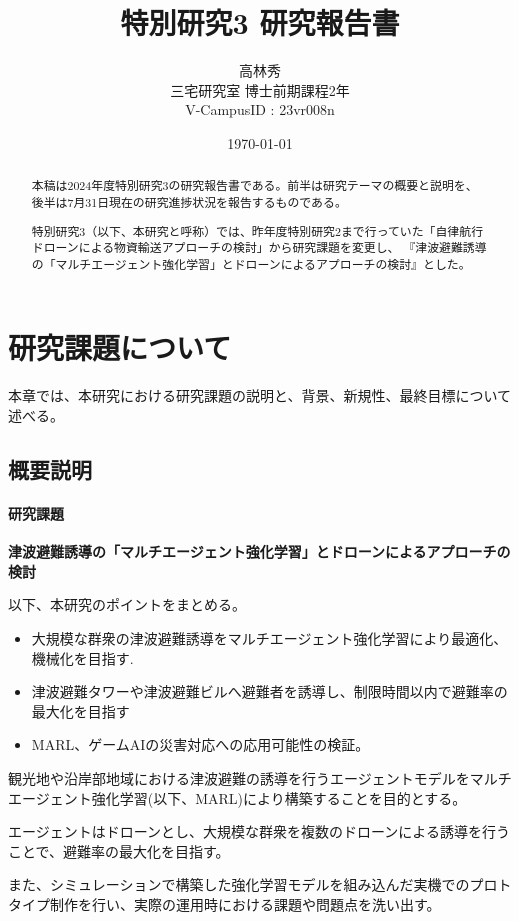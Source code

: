 \documentclass{article}[jsarticle]
\title{特別研究3 研究報告書}
\author{高林秀 \\ 三宅研究室 博士前期課程2年 \\ V-CampusID : 23vr008n}
\date{\today}
\begin{document}
\maketitle

\begin{abstract}
    \noindent
    本稿は2024年度特別研究3の研究報告書である。前半は研究テーマの概要と説明を、後半は7月31日現在の研究進捗状況を報告するものである。\par
    \noindent
    特別研究3（以下、本研究と呼称）では、昨年度特別研究2まで行っていた「自律航行ドローンによる物資輸送アプローチの検討」から研究課題を変更し、
    『津波避難誘導の「マルチエージェント強化学習」とドローンによるアプローチの検討』とした。\par 
    \noindent
\end{abstract}

\tableofcontents

\section{研究課題について}
本章では、本研究における研究課題の説明と、背景、新規性、最終目標について述べる。
\subsection{概要説明}
\paragraph{研究課題}
\begin{center}
    \textbf{津波避難誘導の「マルチエージェント強化学習」とドローンによるアプローチの検討}
\end{center}
以下、本研究のポイントをまとめる。
\begin{itemize}
    \item 大規模な群衆の津波避難誘導をマルチエージェント強化学習により最適化、機械化を目指す.
    \item 津波避難タワーや津波避難ビルへ避難者を誘導し、制限時間以内で避難率の最大化を目指す
    \item MARL、ゲームAIの災害対応への応用可能性の検証。
\end{itemize}
観光地や沿岸部地域における津波避難の誘導を行うエージェントモデルをマルチエージェント強化学習(以下、MARL)により構築することを目的とする。\par
エージェントはドローンとし、大規模な群衆を複数のドローンによる誘導を行うことで、避難率の最大化を目指す。\par
また、シミュレーションで構築した強化学習モデルを組み込んだ実機でのプロトタイプ制作を行い、実際の運用時における課題や問題点を洗い出す。
\end{document}
